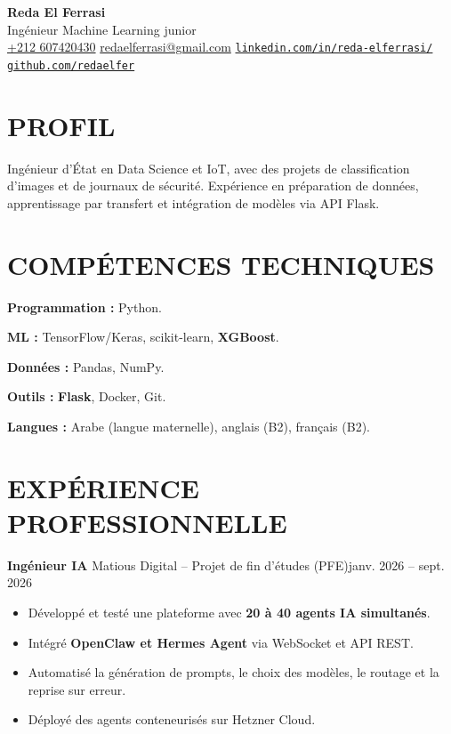 \documentclass[11pt,a4paper]{article}
\newcommand{\entry}[2]{\noindent #1\hfill #2\par}
\begin{document}
\begin{center}
  {\LARGE\bfseries Reda El Ferrasi}\\[3pt]
  {\large Ingénieur Machine Learning junior}\\[5pt]
  {\small
    \href{tel:+212607420430}{+212 607420430}
    \enspace\textbar{}\enspace
    \href{mailto:redaelferrasi@gmail.com}{redaelferrasi@gmail.com}
    \enspace\textbar{}\enspace
    \href{https://www.linkedin.com/in/reda-elferrasi/}{\nolinkurl{linkedin.com/in/reda-elferrasi/}}
    \enspace\textbar{}\enspace
    \href{https://github.com/redaelfer}{\nolinkurl{github.com/redaelfer}}
  }
\end{center}
\vspace{-5pt}


\section*{PROFIL}
Ingénieur d’État en Data Science et IoT, avec des projets de classification d’images et de journaux de sécurité. Expérience en préparation de données, apprentissage par transfert et intégration de modèles via API Flask.

\section*{COMPÉTENCES TECHNIQUES}
\textbf{Programmation :} Python.\par
\textbf{ML :} TensorFlow/Keras, scikit-learn, \textbf{XGBoost}.\par
\textbf{Données :} Pandas, NumPy.\par
\textbf{Outils :} \textbf{Flask}, Docker, Git.\par
\textbf{Langues :} Arabe (langue maternelle), anglais (B2), français (B2).

\section*{EXPÉRIENCE PROFESSIONNELLE}

\entry{\textbf{Ingénieur IA} \textbar{} Matious Digital -- Projet de fin d'études (PFE)}{janv. 2026 -- sept. 2026}
\begin{itemize}
  \item Développé et testé une plateforme avec \textbf{20 à 40 agents IA simultanés}.
  \item Intégré \textbf{OpenClaw et Hermes Agent} via WebSocket et API REST.
  \item Automatisé la génération de prompts, le choix des modèles, le routage et la reprise sur erreur.
  \item Déployé des agents conteneurisés sur Hetzner Cloud.
\end{itemize}
\end{document}
